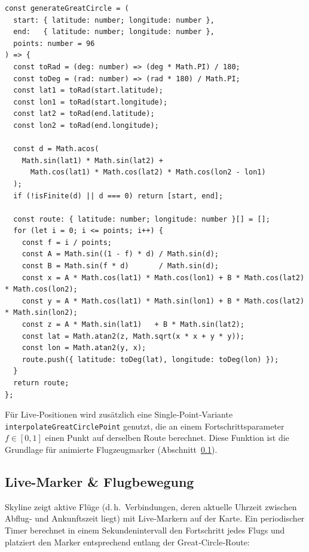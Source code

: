 \begin{lstlisting}[style=skyline-ts,
  caption={Great-Circle-Sampling f\"ur eine Route (\texttt{generateGreatCircle})},
  label={lst:generate_great_circle}]
const generateGreatCircle = (
  start: { latitude: number; longitude: number },
  end:   { latitude: number; longitude: number },
  points: number = 96
) => {
  const toRad = (deg: number) => (deg * Math.PI) / 180;
  const toDeg = (rad: number) => (rad * 180) / Math.PI;
  const lat1 = toRad(start.latitude);
  const lon1 = toRad(start.longitude);
  const lat2 = toRad(end.latitude);
  const lon2 = toRad(end.longitude);

  const d = Math.acos(
    Math.sin(lat1) * Math.sin(lat2) +
      Math.cos(lat1) * Math.cos(lat2) * Math.cos(lon2 - lon1)
  );
  if (!isFinite(d) || d === 0) return [start, end];

  const route: { latitude: number; longitude: number }[] = [];
  for (let i = 0; i <= points; i++) {
    const f = i / points;
    const A = Math.sin((1 - f) * d) / Math.sin(d);
    const B = Math.sin(f * d)       / Math.sin(d);
    const x = A * Math.cos(lat1) * Math.cos(lon1) + B * Math.cos(lat2) * Math.cos(lon2);
    const y = A * Math.cos(lat1) * Math.sin(lon1) + B * Math.cos(lat2) * Math.sin(lon2);
    const z = A * Math.sin(lat1)   + B * Math.sin(lat2);
    const lat = Math.atan2(z, Math.sqrt(x * x + y * y));
    const lon = Math.atan2(y, x);
    route.push({ latitude: toDeg(lat), longitude: toDeg(lon) });
  }
  return route;
};
\end{lstlisting}

Für Live‑Positionen wird zusätzlich eine Single‑Point‑Variante \texttt{interpolateGreatCirclePoint} genutzt, die an einem Fortschrittsparameter $f\in[0,1]$ einen Punkt auf derselben Route berechnet.
Diese Funktion ist die Grundlage für animierte Flugzeugmarker (Abschnitt~\ref{subsec:live_marker}).

\subsection{Live-Marker \& Flugbewegung}
\label{subsec:live_marker}

Skyline zeigt aktive Flüge (d.\,h.\ Verbindungen, deren aktuelle Uhrzeit zwischen Abflug‑ und Ankunftszeit liegt) mit Live‑Markern auf der Karte.
Ein periodischer Timer berechnet in einem Sekundenintervall den Fortschritt jedes Flugs und platziert den Marker entsprechend entlang der Great‑Circle‑Route:

